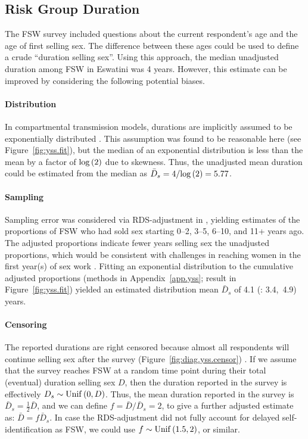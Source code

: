 \subsection{Risk Group Duration}\label{meth.yss}
The FSW survey \cite{Baral2014} included questions about
the current respondent's age and the age of first selling sex.
The difference between these ages could be used to define a crude ``duration selling sex''.
Using this approach, the median unadjusted duration among FSW in Eswatini was 4 years.
However, this estimate can be improved by considering the following potential biases.
\paragraph{Distribution}
In compartmental transmission models,
durations are implicitly assumed to be exponentially distributed \cite{?}.
This assumption was found to be reasonable here (see Figure~\ref{fig:yss.fit}),
but the median of an exponential distribution is less than the mean
by a factor of $\mathrm{log}\,(2)$ due to skewness.
Thus, the unadjusted mean duration could be estimated from the median as
$\bar{D}_{s} = 4/\mathrm{log}\,(2) = 5.77$.
\paragraph{Sampling}
Sampling error was considered via RDS-adjustment in \cite{Baral2014},
yielding estimates of the proportions of FSW
who had sold sex starting 0--2, 3--5, 6--10, and 11+ years ago.
The adjusted proportions indicate fewer years selling sex \vs the unadjusted proportions,
which would be consistent with
challenges in reaching women in the first year(s) of sex work \cite{Cheuk2020}.
Fitting an exponential distribution to the cumulative adjusted proportions
(methods in Appendix~\ref{app.yss}; result in Figure~\ref{fig:yss.fit})
yielded an estimated distribution mean $\bar{D}_s$ of 4.1 (\ci: 3.4,~4.9) years.
\paragraph{Censoring}
The reported durations are right censored
because almost all respondents will continue selling sex after the survey
(Figure~\ref{fig:diag.yss.censor}) \cite{Fazito2012}.
If we assume that the survey reaches FSW
at a random time point during their total (eventual) duration selling sex $D$,
then the duration reported in the survey is effectively $D_s \sim \mathrm{Unif}\,(0,D)$.
Thus, the mean duration reported in the survey is $\bar{D}_s = \frac12 \bar{D}$,
and we can define $f = \bar{D} / \bar{D}_s = 2$,
to give a further adjusted estimate as: $\bar{D} = f\bar{D}_s$.
In case the RDS-adjustment did not fully account for delayed self-identification as FSW,
we could use $f \sim \mathrm{Unif}\,(1.5,2)$, or similar.
